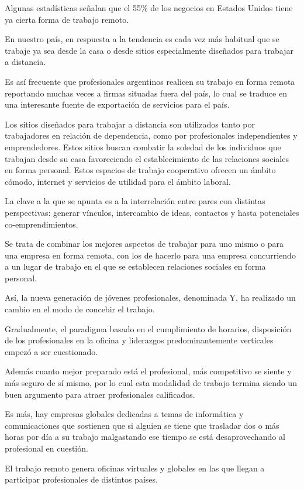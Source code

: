 \documentclass[a4paper, 12pt]{article}
\begin{document}
Algunas estadísticas señalan que el 55\% de los negocios en Estados Unidos tiene ya cierta forma de trabajo remoto.

En nuestro país, en respuesta a la tendencia es cada vez más habitual que se trabaje ya sea desde la casa o desde sitios especialmente diseñados para trabajar a distancia. 

Es así frecuente que profesionales argentinos realicen su trabajo en forma remota reportando muchas veces a firmas situadas fuera del país, lo cual se traduce en una interesante fuente de exportación de servicios para el país.

Los sitios diseñados para trabajar a distancia son utilizados tanto por trabajadores en relación de dependencia, como por profesionales independientes y emprendedores. Estos sitios buscan combatir la soledad de los individuos que trabajan desde su casa favoreciendo el establecimiento de las relaciones sociales en forma personal. Estos espacios de trabajo cooperativo ofrecen un ámbito cómodo, internet y servicios de utilidad para el ámbito laboral.

La clave a la que se apunta es a la interrelación entre pares con distintas perspectivas: generar vínculos, intercambio de ideas, contactos y hasta potenciales co-emprendimientos. 

Se trata de combinar los mejores aspectos de trabajar para uno mismo o para una empresa en forma remota, con los de hacerlo para una empresa concurriendo a un lugar de trabajo en el que se establecen relaciones sociales en forma personal.

Así, la nueva generación de jóvenes profesionales, denominada Y, ha realizado un cambio en el modo de concebir el trabajo.

Gradualmente, el paradigma basado en el cumplimiento de horarios, disposición de los profesionales en la oficina y liderazgos predominantemente verticales empezó a ser cuestionado. 

Además cuanto mejor preparado está el profesional, más competitivo se siente y más seguro de sí mismo, por lo cual esta modalidad de trabajo termina siendo un buen argumento para atraer profesionales calificados.

Es más, hay empresas globales dedicadas a temas de informática y comunicaciones que sostienen que si alguien se tiene que trasladar dos o más horas por día a su trabajo malgastando ese tiempo se está desaprovechando al profesional en cuestión.

El trabajo remoto genera oficinas virtuales y globales en las que llegan a participar profesionales de distintos países. 
\end{document}
